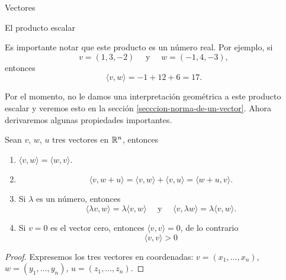 \begin{chapter}{Vectores}
\begin{section}{El producto escalar}
        
        
        Es importante notar  que este producto es un número real. Por ejemplo, si
        \begin{equation*}
            v= (1, 3, - 2) \quad\text{ y } \quad w= (- 1, 4, - 3),
        \end{equation*}
        entonces
        \begin{equation*}
            \langle v , w \rangle= - 1 + 12 + 6 = 17.
        \end{equation*}
        
        Por el momento, no le damos una interpretación geométrica a este producto escalar y veremos esto en la sección \ref{secccion-norma-de-un-vector}. Ahora derivaremos algunas propiedades importantes.
        
        \begin{proposicion}\label{propiedades-del-producto-escalar}
           Sean $v$, $w$, $u$  tres vectores en $\mathbb R^n$, entonces
     
        \begin{enumerate}[label=\textbf{P\arabic*.},ref=P\arabic*]
            \item\label{prop-P1}	$\langle v , w \rangle = \langle w , v \rangle$.
            \item\label{prop-P2} 
            \begin{equation*}
                \langle v , w + u \rangle =\langle v , w \rangle + \langle v , u \rangle = \langle w +u , v \rangle.
            \end{equation*}
            \item\label{prop-P3} Si $\lambda$ es un número, entonces 
            \begin{equation*}
                \langle \lambda v , w \rangle = \lambda \langle v , w \rangle \quad \text{ y } \quad  \langle v , \lambda w \rangle = \lambda \langle v , w \rangle.
            \end{equation*}
            \item\label{prop-P4} Si $v=0$ es el vector cero, entonces $\langle v , v \rangle =0$,  de lo contrario
            \begin{equation*}
                \langle v , v \rangle >0
            \end{equation*}
        \end{enumerate}
        \end{proposicion}
        \begin{proof} Expresemos los tres vectores en coordenadas:  $v = (x_1, \ldots,x_n)$, $w =  (y_1, \ldots, y_n)$, $u = (z_1, \ldots, z_n)$. 


\end{proof}
\end{section}
\end{chapter}

